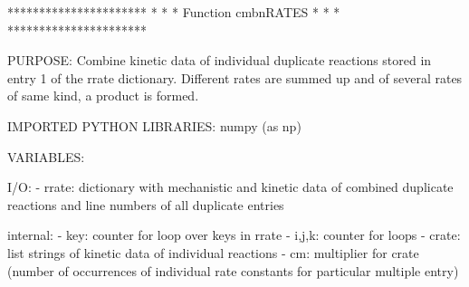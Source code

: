 \begin{DoxyVerb}**********************
*                    *
* Function cmbnRATES *
*                    *
**********************

PURPOSE:
    Combine kinetic data of individual duplicate reactions
    stored in entry 1 of the rrate dictionary. Different rates
    are summed up and of several rates of same kind, a product
    is formed.

IMPORTED PYTHON LIBRARIES:
    numpy (as np)

VARIABLES:

I/O:
    - rrate:    dictionary with mechanistic and kinetic data of
                combined duplicate reactions and line numbers of
                all duplicate entries

internal:
    - key:      counter for loop over keys in rrate
    - i,j,k:    counter for loops
    - crate:    list strings of kinetic data of individual reactions
    - cm:       multiplier for crate (number of occurrences of
                individual rate constants for particular multiple entry)\end{DoxyVerb}
 
